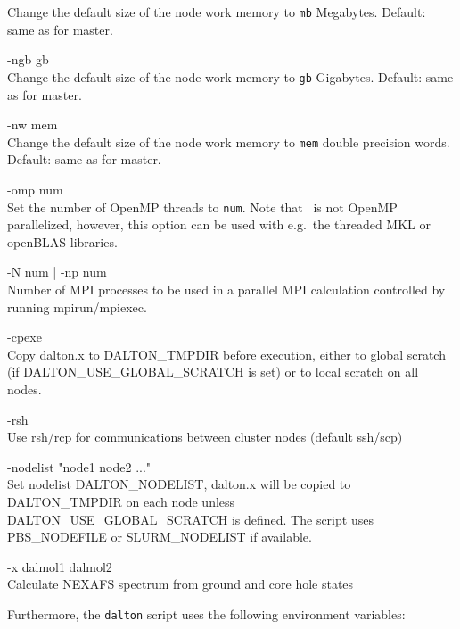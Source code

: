 \begin{list}{--}{}
  Change the default size of the node work memory
   to \verb|mb| Megabytes. Default: same as for master.
\item[-ngb gb \hfill] \hfill \\
  Change the default size of the node work memory
   to \verb|gb| Gigabytes. Default: same as for master.
\item[-nw mem \hfill] \hfill \\
  Change the default size of the node work memory
   to \verb|mem| double precision words. Default: same as for master.
\item[-omp num\hfill] \hfill \\
  Set the number of OpenMP threads to \verb|num|. Note that \dalton\ is not OpenMP
  parallelized, however, this option can be used with e.g.\ the
  threaded MKL or openBLAS libraries.
\item[-N num | -np num\hfill] \hfill \\
  Number of MPI processes to be used in a parallel MPI calculation
  controlled by running mpirun/mpiexec.
\item[-cpexe \hfill] \hfill \\
  Copy dalton.x to DALTON\_TMPDIR before execution, either to
  global scratch (if DALTON\_USE\_GLOBAL\_SCRATCH is set) or to
  local scratch on all nodes.
\item[-rsh \hfill] \hfill \\
  Use rsh/rcp for communications between cluster nodes (default ssh/scp)
\item[-nodelist "node1 node2 ..." \hfill] \hfill \\
  Set nodelist DALTON\_NODELIST, dalton.x will be copied to
  DALTON\_TMPDIR on each node unless DALTON\_USE\_GLOBAL\_SCRATCH
  is defined. The script uses PBS\_NODEFILE or SLURM\_NODELIST
  if available.
\item[-x dalmol1 dalmol2 \hfill] \hfill \\
  Calculate NEXAFS spectrum from ground and core hole states
\end{list}

Furthermore, the \verb|dalton| script uses the following environment
variables:


